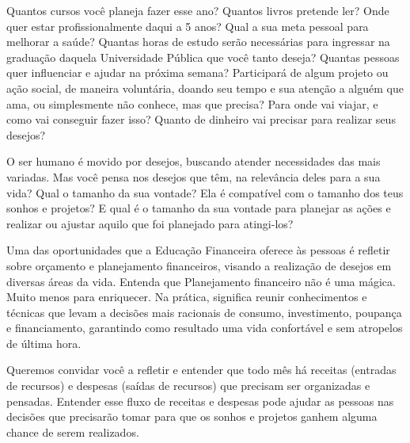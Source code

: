 \label{fin-exp-2}

Quantos cursos você planeja fazer esse ano? Quantos livros pretende ler? Onde quer estar profissionalmente daqui a 5 anos? Qual a sua meta pessoal para melhorar a saúde? Quantas horas de estudo serão necessárias para ingressar na graduação daquela Universidade Pública que você tanto deseja? Quantas pessoas quer influenciar e ajudar na próxima semana? Participará de algum projeto ou ação social, de maneira voluntária, doando seu tempo e sua atenção a alguém que ama, ou simplesmente não conhece, mas que precisa? Para onde vai viajar, e como vai conseguir fazer isso? Quanto de dinheiro vai precisar para realizar seus desejos? 

O ser humano é movido por desejos, buscando atender necessidades das mais variadas. Mas você pensa nos desejos que têm, na relevância deles para a sua vida? Qual o tamanho da sua vontade? Ela é compatível com o tamanho dos teus sonhos e projetos? E qual é o tamanho da sua vontade para planejar as ações e realizar ou ajustar aquilo que foi planejado para atingi-los? 

Uma das oportunidades que a Educação Financeira oferece às pessoas é refletir sobre orçamento e planejamento financeiros, visando a realização de desejos em diversas áreas da vida. Entenda que Planejamento financeiro não é uma mágica. Muito menos para enriquecer. Na prática, significa reunir conhecimentos e técnicas que levam a decisões mais racionais de consumo, investimento, poupança e financiamento, garantindo como resultado uma vida confortável e sem atropelos de última hora.

Queremos convidar você a refletir e entender que todo mês há receitas (entradas de recursos) e despesas (saídas de recursos) que precisam ser organizadas e pensadas. Entender esse fluxo de receitas e despesas pode ajudar as pessoas nas decisões que precisarão tomar para que os sonhos e projetos ganhem alguma chance de serem realizados. 

